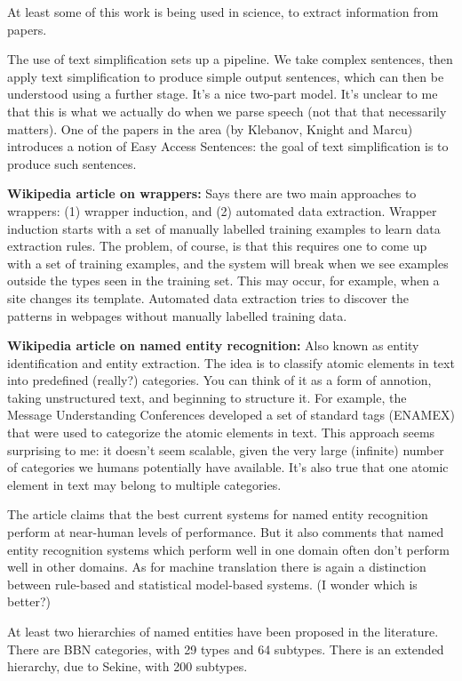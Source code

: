 At least some of this work is being used in science, to extract
information from papers.

The use of text simplification sets up a pipeline.  We take complex
sentences, then apply text simplification to produce simple output
sentences, which can then be understood using a further stage.  It's a
nice two-part model.  It's unclear to me that this is what we actually
do when we parse speech (not that that necessarily matters).  One of
the papers in the area (by Klebanov, Knight and Marcu) introduces a
notion of Easy Access Sentences: the goal of text simplification is to
produce such sentences.

\textbf{Wikipedia article on wrappers:} Says there are two main
approaches to wrappers: (1) wrapper induction, and (2) automated data
extraction.  Wrapper induction starts with a set of manually labelled
training examples to learn data extraction rules.  The problem, of
course, is that this requires one to come up with a set of training
examples, and the system will break when we see examples outside the
types seen in the training set.  This may occur, for example, when a
site changes its template.  Automated data extraction tries to
discover the patterns in webpages without manually labelled training
data.

\textbf{Wikipedia article on named entity recognition:} Also known as
entity identification and entity extraction.  The idea is to classify
atomic elements in text into predefined (really?) categories.  You can
think of it as a form of annotion, taking unstructured text, and
beginning to structure it.  For example, the Message Understanding
Conferences developed a set of standard tags (ENAMEX) that were used
to categorize the atomic elements in text.  This approach seems
surprising to me: it doesn't seem scalable, given the very large
(infinite) number of categories we humans potentially have available.
It's also true that one atomic element in text may belong to multiple
categories.

The article claims that the best current systems for named entity
recognition perform at near-human levels of performance.  But it also
comments that named entity recognition systems which perform well in
one domain often don't perform well in other domains.  As for machine
translation there is again a distinction between rule-based and
statistical model-based systems.  (I wonder which is better?)

At least two hierarchies of named entities have been proposed in the
literature.  There are BBN categories, with 29 types and 64 subtypes.
There is an extended hierarchy, due to Sekine, with 200 subtypes.


